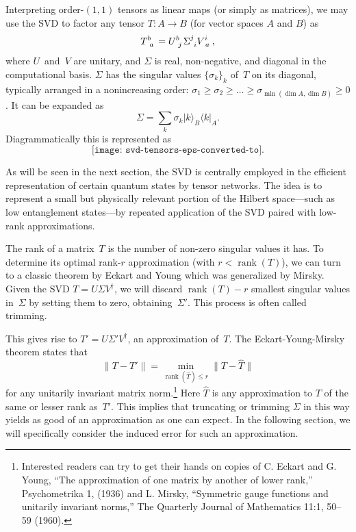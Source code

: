 \documentclass[aps,pra,12pt,nofootinbib,superscriptaddress,longbibliography]{revtex4-1}
\theoremstyle{plain}
\theoremstyle{definition}
\newcommand{\bra}[1]{\mbox{$\langle #1|$}}
\newcommand{\ket}[1]{\mbox{$|#1\rangle$}}
\DeclareMathOperator{\rank}{rank}
\newcommand{\be}{\begin{equation}}
\newcommand{\ee}{\end{equation}}
\begin{document}
Interpreting order-$(1,1)$ tensors as linear maps (or simply as matrices),
we may use the SVD to factor
any tensor $T: A \to B$ (for vector spaces $A$ and $B$) as
\be
T\indices{^b_a} = U\indices{^b_j} \Sigma\indices{^j_i} V\indices{^i_a},
\ee
where $U$~and~$V$ are unitary,
and $\Sigma$ is %
real, non-negative, and diagonal in the computational basis.
$\Sigma$ has the singular values $\{\sigma_k\}_k$ of~$T$ on its diagonal,
typically arranged in a nonincreasing order:
$\sigma_1 \ge \sigma_2 \ge \ldots \ge \sigma_{\min(\dim A, \dim B)} \ge 0$.
It can be expanded as
\be 
\Sigma
= \sum_{k} \sigma_k \ket{k}_B \bra{k}_A.
\ee
Diagrammatically this is represented as
\be
\texttt{[image: svd-tensors-eps-converted-to]}\label{fig:SVD-s}.
\ee

As will be seen in the next section, the SVD is centrally employed in the efficient representation of certain quantum states by tensor networks.  The idea is to represent a small but physically relevant portion of the Hilbert space---such as low entanglement states---by repeated application of the SVD paired with low-rank approximations.

The rank of a matrix~$T$ is the number of non-zero singular values it has.
To determine its optimal rank-$r$ approximation (with $r < \rank(T)$), we can turn to a classic theorem by Eckart and Young which was generalized by Mirsky.
Given the SVD $T = U\Sigma V^\dagger$, we will discard $\rank(T)-r$ smallest singular values in~$\Sigma$ by setting them to zero, obtaining~$\Sigma'$.
This process is often called trimming.

This gives rise to $T' = U\Sigma' V^\dagger$, an approximation of~$T$.  The Eckart-Young-Mirsky theorem states that
\begin{equation}
\lVert T -T' \rVert =  \min_{\rank(\hat{T}) \le r} \lVert T -\hat{T}\rVert
\end{equation}
for any unitarily invariant matrix norm.\footnote{Interested readers can try to get their hands on copies of
C. Eckart and G. Young, ``The approximation of one matrix by another of lower rank,'' Psychometrika 1, (1936)
and
L. Mirsky, ``Symmetric gauge functions and unitarily invariant norms,'' The Quarterly Journal of Mathematics 11:1, 50--59 (1960).}
Here $\hat{T}$ is any approximation to $T$ of the same or lesser rank as~$T'$.
This implies that truncating or trimming $\Sigma$ in this way yields as good of an approximation as one can expect.
In the following section, we will specifically consider the induced error for such an approximation.
\end{document}

